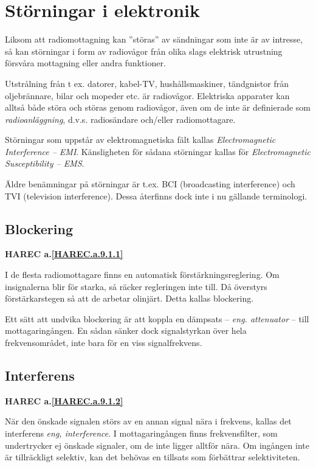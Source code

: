 \section{Störningar i elektronik}

Liksom att radiomottagning kan ''störas'' av sändningar som inte är av
intresse, så kan störningar i form av radiovågor från olika slags
elektrisk utrustning försvåra mottagning eller andra funktioner.

Utstrålning från t ex. datorer, kabel-TV, hushållsmaskiner,
tändgnistor från oljebrännare, bilar och mopeder etc. är radiovågor.
Elektriska apparater kan alltså både störa och störas genom
radiovågor, även om de inte är definierade som \emph{radioanläggning},
d.v.s. radiosändare och/eller radiomottagare.

Störningar som uppstår av elektromagnetiska fält kallas
\emph{Electromagnetic Interference -- EMI}. Känsligheten för sådana
störningar kallas för \emph{Electromagnetic Susceptibility -- EMS}.

Äldre benämningar på störningar är t.ex. BCI (broadcasting interference) och
TVI (television interference). Dessa återfinns dock inte i nu gällande
terminologi.

\subsection{Blockering}
\textbf{
HAREC a.\ref{HAREC.a.9.1.1}\label{myHAREC.a.9.1.1}
}

I de flesta radiomottagare finns en automatisk förstärkningsreglering. Om
insignalerna blir för starka, så räcker regleringen inte till. Då överstyrs
förstärkarstegen så att de arbetar olinjärt. Detta kallas blockering.

Ett sätt att undvika blockering är att koppla en dämpsats -- \emph{eng.
attenuator} -- till mottagaringången. En sådan sänker dock signalstyrkan
över hela frekvensområdet, inte bara för en viss signalfrekvens.

\subsection{Interferens}
\textbf{
HAREC a.\ref{HAREC.a.9.1.2}\label{myHAREC.a.9.1.2}
}

När den önskade signalen störs av en annan signal nära i frekvens, kallas det
interferens \emph{eng, interference}. I mottagaringången finns frekvensfilter,
som undertrycker ej önskade signaler, om de inte ligger alltför nära. Om
ingången inte är tillräckligt selektiv, kan det behövas en tillsats som
förbättrar selektiviteten.


